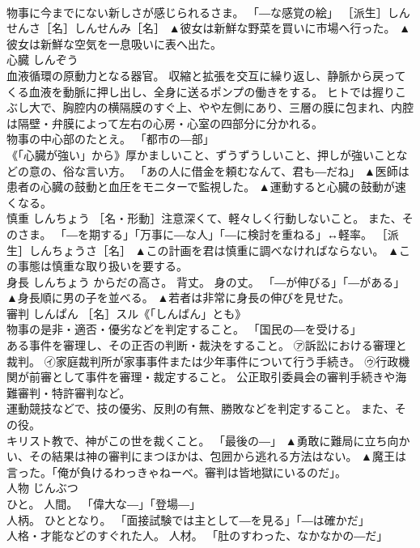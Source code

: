 \documentclass[8pt]{extreport}
\begin{document}
\begin{CJK}{UTF8}{min}
\\	物事に今までにない新しさが感じられるさま。 「―な感覚の絵」 ［派生］しんせんさ［名］しんせんみ［名］	▲彼女は新鮮な野菜を買いに市場へ行った。 ▲彼女は新鮮な空気を一息吸いに表へ出た。
\\	心臓	しんぞう	
\\	血液循環の原動力となる器官。 収縮と拡張を交互に繰り返し、静脈から戻ってくる血液を動脈に押し出し、全身に送るポンプの働きをする。 ヒトでは握りこぶし大で、胸腔内の横隔膜のすぐ上、やや左側にあり、三層の膜に包まれ、内腔は隔壁・弁膜によって左右の心房・心室の四部分に分かれる。 
\\	物事の中心部のたとえ。 「都市の―部」 
\\	《「心臓が強い」から》厚かましいこと、ずうずうしいこと、押しが強いことなどの意の、俗な言い方。 「あの人に借金を頼むなんて、君も―だね」	▲医師は患者の心臓の鼓動と血圧をモニターで監視した。 ▲運動すると心臓の鼓動が速くなる。
\\	慎重	しんちょう	［名・形動］注意深くて、軽々しく行動しないこと。 また、そのさま。 「―を期する」「万事に―な人」「―に検討を重ねる」↔軽率。 ［派生］しんちょうさ［名］	▲この計画を君は慎重に調べなければならない。 ▲この事態は慎重な取り扱いを要する。
\\	身長	しんちょう	からだの高さ。 背丈。 身の丈。 「―が伸びる」「―がある」	▲身長順に男の子を並べる。 ▲若者は非常に身長の伸びを見せた。
\\	審判	しんぱん	［名］スル《「しんばん」とも》 
\\	物事の是非・適否・優劣などを判定すること。 「国民の―を受ける」 
\\	ある事件を審理し、その正否の判断・裁決をすること。 ㋐訴訟における審理と裁判。 ㋑家庭裁判所が家事事件または少年事件について行う手続き。 ㋒行政機関が前審として事件を審理・裁定すること。 公正取引委員会の審判手続きや海難審判・特許審判など。 
\\	運動競技などで、技の優劣、反則の有無、勝敗などを判定すること。 また、その役。 
\\	キリスト教で、神がこの世を裁くこと。 「最後の―」	▲勇敢に難局に立ち向かい、その結果は神の審判にまつほかは、包囲から逃れる方法はない。 ▲魔王は言った。「俺が負けるわっきゃねーべ。審判は皆地獄にいるのだ」。
\\	人物	じんぶつ	
\\	ひと。 人間。 「偉大な―」「登場―」 
\\	人柄。 ひととなり。 「面接試験では主として―を見る」「―は確かだ」 
\\	人格・才能などのすぐれた人。 人材。 「肚のすわった、なかなかの―だ」 

\end{CJK}
\end{document}
